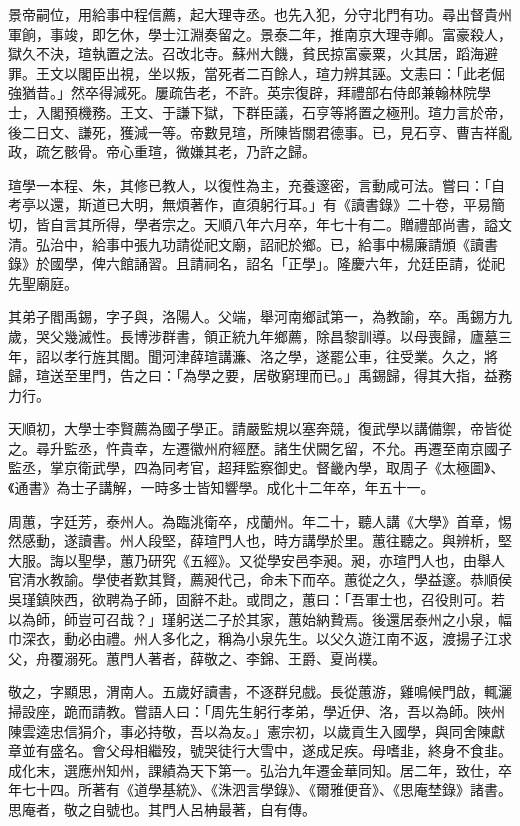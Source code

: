 \begin{pinyinscope}
景帝嗣位，用給事中程信薦，起大理寺丞。也先入犯，分守北門有功。尋出督貴州軍餉，事竣，即乞休，學士江淵奏留之。景泰二年，推南京大理寺卿。富豪殺人，獄久不決，瑄執置之法。召改北寺。蘇州大饑，貧民掠富豪粟，火其居，蹈海避罪。王文以閣臣出視，坐以叛，當死者二百餘人，瑄力辨其誣。文恚曰：「此老倔強猶昔。」然卒得減死。屢疏告老，不許。英宗復辟，拜禮部右侍郎兼翰林院學士，入閣預機務。王文、于謙下獄，下群臣議，石亨等將置之極刑。瑄力言於帝，後二日文、謙死，獲減一等。帝數見瑄，所陳皆關君德事。已，見石亨、曹吉祥亂政，疏乞骸骨。帝心重瑄，微嫌其老，乃許之歸。

瑄學一本程、朱，其修已教人，以復性為主，充養邃密，言動咸可法。嘗曰：「自考亭以還，斯道已大明，無煩著作，直須躬行耳。」有《讀書錄》二十卷，平易簡切，皆自言其所得，學者宗之。天順八年六月卒，年七十有二。贈禮部尚書，謚文清。弘治中，給事中張九功請從祀文廟，詔祀於鄉。已，給事中楊廉請頒《讀書錄》於國學，俾六館誦習。且請祠名，詔名「正學」。隆慶六年，允廷臣請，從祀先聖廟庭。

其弟子閻禹錫，字子與，洛陽人。父端，舉河南鄉試第一，為教諭，卒。禹錫方九歲，哭父幾滅性。長博涉群書，領正統九年鄉薦，除昌黎訓導。以母喪歸，廬墓三年，詔以孝行旌其閭。聞河津薛瑄講濂、洛之學，遂罷公車，往受業。久之，將歸，瑄送至里門，告之曰：「為學之要，居敬窮理而已。」禹錫歸，得其大指，益務力行。

天順初，大學士李賢薦為國子學正。請嚴監規以塞奔競，復武學以講備禦，帝皆從之。尋升監丞，忤貴幸，左遷徽州府經歷。諸生伏闕乞留，不允。再遷至南京國子監丞，掌京衛武學，四為同考官，超拜監察御史。督畿內學，取周子《太極圖》、《通書》為士子講解，一時多士皆知響學。成化十二年卒，年五十一。

周蕙，字廷芳，泰州人。為臨洮衛卒，戍蘭州。年二十，聽人講《大學》首章，惕然感動，遂讀書。州人段堅，薛瑄門人也，時方講學於里。蕙往聽之。與辨析，堅大服。誨以聖學，蕙乃研究《五經》。又從學安邑李昶。昶，亦瑄門人也，由舉人官清水教諭。學使者歎其賢，薦昶代己，命未下而卒。蕙從之久，學益邃。恭順侯吳瑾鎮陜西，欲聘為子師，固辭不赴。或問之，蕙曰：「吾軍士也，召役則可。若以為師，師豈可召哉？」瑾躬送二子於其家，蕙始納贄焉。後還居泰州之小泉，幅巾深衣，動必由禮。州人多化之，稱為小泉先生。以父久遊江南不返，渡揚子江求父，舟覆溺死。蕙門人著者，薛敬之、李錦、王爵、夏尚樸。

敬之，字顯思，渭南人。五歲好讀書，不逐群兒戲。長從蕙游，雞鳴候門啟，輒灑掃設座，跪而請教。嘗語人曰：「周先生躬行孝弟，學近伊、洛，吾以為師。陜州陳雲逵忠信狷介，事必持敬，吾以為友。」憲宗初，以歲貢生入國學，與同舍陳獻章並有盛名。會父母相繼歿，號哭徒行大雪中，遂成足疾。母嗜韭，終身不食韭。成化末，選應州知州，課績為天下第一。弘治九年遷金華同知。居二年，致仕，卒年七十四。所著有《道學基統》、《洙泗言學錄》、《爾雅便音》、《思庵埜錄》諸書。思庵者，敬之自號也。其門人呂柟最著，自有傳。


\end{pinyinscope}
